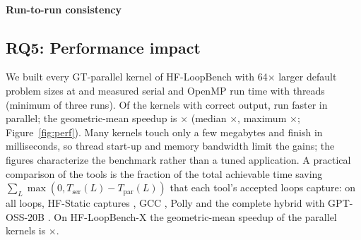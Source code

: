 \paragraph{Run-to-run consistency} \consistencyText{}

\subsection{RQ5: Performance impact}
\label{sec:rq-perf}
We built every GT-parallel kernel of HF-LoopBench with 64$\times$ larger default problem sizes at  and measured serial and OpenMP run time with \perfThreads{} threads (minimum of three runs). Of the \nPerfValid{} kernels with correct output, \perfFracGtOne{} run faster in parallel; the geometric-mean speedup is \perfGeo{}$\times$ (median \perfMedian{}$\times$, maximum \perfMax{}$\times$; Figure~\ref{fig:perf}). Many kernels touch only a few megabytes and finish in milliseconds, so thread start-up and memory bandwidth limit the gains; the figures characterize the benchmark rather than a tuned application. A practical comparison of the tools is the fraction of the total achievable time saving $\sum_L \max(0, T_\mathrm{ser}(L)-T_\mathrm{par}(L))$ that each tool's accepted loops capture: on all loops, HF-Static captures \covFullStatic{}, GCC \covFullGcc{}, Polly \covFullPolly{} and the complete hybrid with GPT-OSS-20B \covFullHTwenty{}. On HF-LoopBench-X the geometric-mean speedup of the \xPerfN{} parallel kernels is \xPerfGeo{}$\times$.


